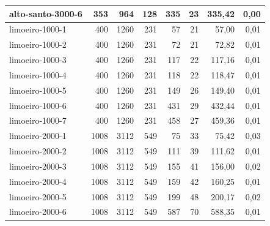 \begin{table}[ht!]
{\begin{tabular}{lrrr|rr|rr}
			alto-santo-3000-6                                                                                    & 353  & 964  & 128 & 335 & 23 & 335,42 & 0,00 \\
			\midrule
			limoeiro-1000-1                                                                                      & 400  & 1260 & 231 & 57  & 21 & 57,00  & 0,01 \\
			limoeiro-1000-2                                                                                      & 400  & 1260 & 231 & 72  & 21 & 72,82  & 0,01 \\
			limoeiro-1000-3                                                                                      & 400  & 1260 & 231 & 117 & 22 & 117,16 & 0,01 \\
			limoeiro-1000-4                                                                                      & 400  & 1260 & 231 & 118 & 22 & 118,47 & 0,01 \\
			limoeiro-1000-5                                                                                      & 400  & 1260 & 231 & 149 & 26 & 149,40 & 0,01 \\
			limoeiro-1000-6                                                                                      & 400  & 1260 & 231 & 431 & 29 & 432,44 & 0,01 \\
			limoeiro-1000-7                                                                                      & 400  & 1260 & 231 & 458 & 27 & 459,36 & 0,01 \\
			limoeiro-2000-1                                                                                      & 1008 & 3112 & 549 & 75  & 33 & 75,42  & 0,03 \\
			limoeiro-2000-2                                                                                      & 1008 & 3112 & 549 & 111 & 39 & 111,62 & 0,01 \\
			limoeiro-2000-3                                                                                      & 1008 & 3112 & 549 & 155 & 41 & 156,00 & 0,02 \\
			limoeiro-2000-4                                                                                      & 1008 & 3112 & 549 & 159 & 42 & 160,25 & 0,01 \\
			limoeiro-2000-5                                                                                      & 1008 & 3112 & 549 & 199 & 48 & 200,17 & 0,02 \\
			limoeiro-2000-6                                                                                      & 1008 & 3112 & 549 & 587 & 70 & 588,35 & 0,01 \\

\end{tabular}}
\end{table}
